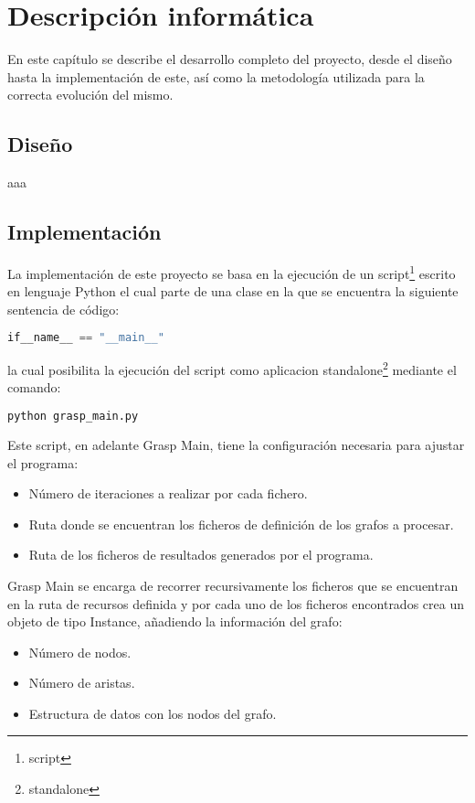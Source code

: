 
\chapter{Descripción informática} %

\label{Chapter4} %


En este capítulo se describe el desarrollo completo del proyecto, desde el diseño  hasta la implementación de este, así como la metodología utilizada para la correcta evolución del mismo.

\section{Diseño}
aaa

\section{Implementación}
La implementación de este proyecto se basa en la ejecución de un script\footnote{script} escrito en lenguaje Python el cual parte de una clase en la que se encuentra la siguiente sentencia de código:
 \begin{lstlisting}[language=Python]
 if__name__ == "__main__"
 \end{lstlisting}
 la cual posibilita la ejecución del script como aplicacion standalone\footnote{standalone} mediante el comando:
  \begin{lstlisting}[language=bash]
  python grasp_main.py
 \end{lstlisting}
 Este script, en adelante Grasp Main, tiene la configuración necesaria para ajustar el programa:
 \begin{itemize}
 	\item Número de iteraciones a realizar por cada fichero.
 	\item Ruta donde se encuentran los ficheros de definición de los grafos a procesar.
 	\item Ruta de los ficheros de resultados generados por el programa.	
 \end{itemize}

Grasp Main se encarga de recorrer recursivamente los ficheros que se encuentran en la ruta de recursos definida y por cada uno de los ficheros encontrados crea un objeto de tipo Instance, añadiendo la información del grafo:
 \begin{itemize}
	\item Número de nodos.
	\item Número de aristas.
	\item Estructura de datos con los nodos del grafo.
\end{itemize}


